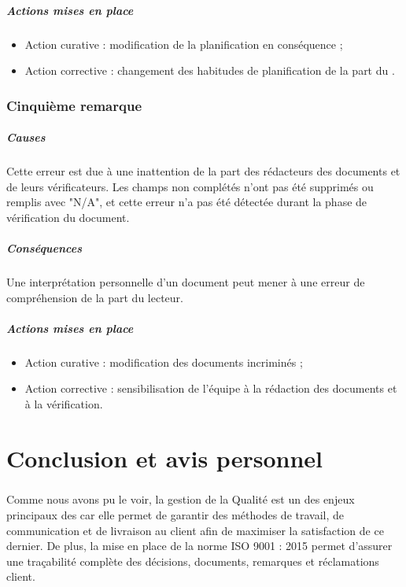 \documentclass[asi]{picInsa}
\begin{document}
\paragraph*{Actions mises en place}
\begin{itemize}
\item Action curative : modification de la planification en conséquence ;
\item Action corrective : changement des habitudes de planification de la part du \CP{}.
\end{itemize}


\subsection{Cinquième remarque}
\paragraph*{Causes} Cette erreur est due à une inattention de la part des rédacteurs des documents et de leurs vérificateurs. Les champs non complétés n'ont pas été supprimés ou remplis avec "N/A", et cette erreur n’a pas été détectée durant la phase de vérification du document.

\paragraph*{Conséquences} Une interprétation personnelle d'un document peut mener à une erreur de compréhension de la part du lecteur.

\paragraph*{Actions mises en place}
\begin{itemize}
\item Action curative : modification des documents incriminés ;
\item Action corrective : sensibilisation de l'équipe à la rédaction des documents et à la vérification.
\end{itemize}

\chapter{Conclusion et avis personnel}
\paragraph*{} Comme nous avons pu le voir, la gestion de la Qualité est un des enjeux principaux des \PIC{} car elle permet de garantir des méthodes de travail, de communication et de livraison au client afin de maximiser la satisfaction de ce dernier. De plus, la mise en place de la norme ISO 9001 : 2015 permet d'assurer une traçabilité complète des décisions, documents, remarques et réclamations client.
\end{document}

